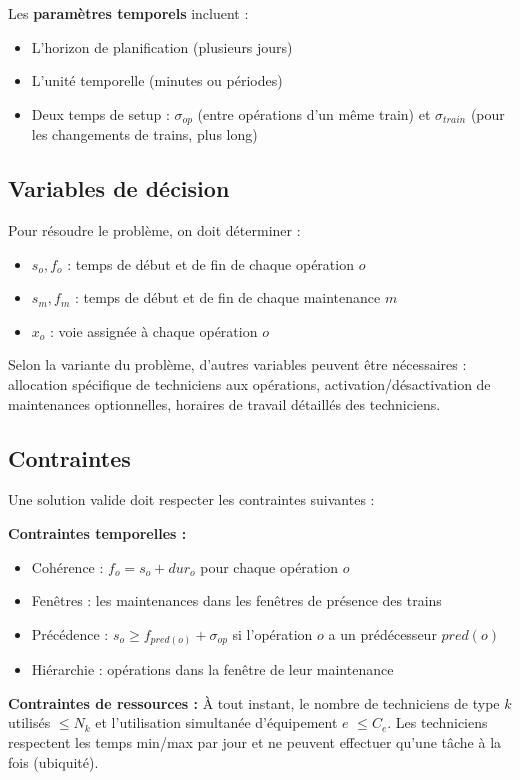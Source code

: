 Les \textbf{paramètres temporels} incluent :
\begin{itemize}
	\item L'horizon de planification (plusieurs jours)
	\item L'unité temporelle (minutes ou périodes)
	\item Deux temps de setup : $\sigma_{op}$ (entre opérations d'un même train) et $\sigma_{train}$ (pour les changements de trains, plus long)
\end{itemize}

\subsection{Variables de décision}

Pour résoudre le problème, on doit déterminer :
\begin{itemize}
	\item $s_o, f_o$ : temps de début et de fin de chaque opération $o$
	\item $s_m, f_m$ : temps de début et de fin de chaque maintenance $m$
	\item $x_o$ : voie assignée à chaque opération $o$
\end{itemize}

Selon la variante du problème, d'autres variables peuvent être nécessaires : allocation spécifique de techniciens aux opérations, activation/désactivation de maintenances optionnelles, horaires de travail détaillés des techniciens.

\subsection{Contraintes}

Une solution valide doit respecter les contraintes suivantes :

\textbf{Contraintes temporelles :}
\begin{itemize}
	\item Cohérence : $f_o = s_o + dur_o$ pour chaque opération $o$
	\item Fenêtres : les maintenances dans les fenêtres de présence des trains
	\item Précédence : $s_o \geq f_{pred(o)} + \sigma_{op}$ si l'opération $o$ a un prédécesseur $pred(o)$
	\item Hiérarchie : opérations dans la fenêtre de leur maintenance
\end{itemize}

\textbf{Contraintes de ressources :}
À tout instant, le nombre de techniciens de type $k$ utilisés $\leq N_k$ et l'utilisation simultanée d'équipement $e$ $\leq C_e$. Les techniciens respectent les temps min/max par jour et ne peuvent effectuer qu'une tâche à la fois (ubiquité).


